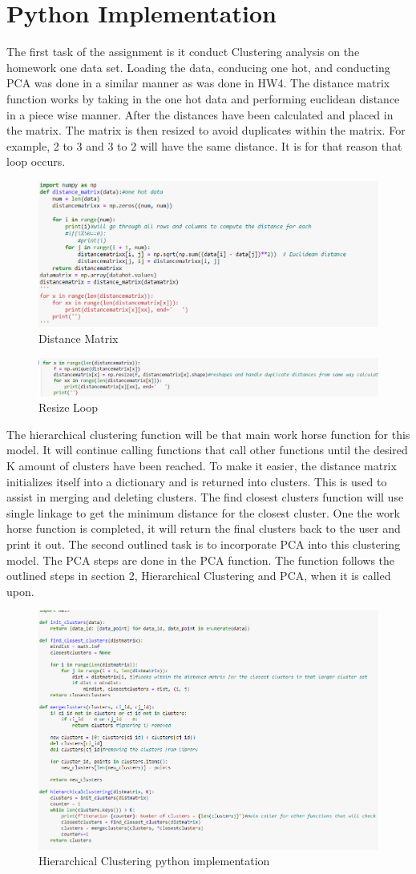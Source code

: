 \documentclass{article}
\begin{document}
\section{Python Implementation}
The first task of the assignment is it conduct  Clustering analysis on the homework one data set. Loading the data, conducing one hot, and conducting PCA was done in a similar manner as was done in HW4. The distance matrix function works by taking in the one hot data and performing euclidean distance in a piece wise manner. After the distances have been calculated and placed in the matrix. The matrix is then resized to avoid duplicates within the matrix. For example, 2 to 3 and 3 to 2 will have the same distance. It is for that reason that loop occurs.
\begin{figure}
    \centering
    \includegraphics[width=0.5\linewidth]{a.png}
    \caption{Distance Matrix}
    \label{fig:enter-label}
\end{figure}
\begin{figure}
    \centering
    \includegraphics[width=0.5\linewidth]{b.png}
    \caption{Resize Loop}
    \label{fig:enter-label}
\end{figure}
The hierarchical clustering function will be that main work horse function for this model. It will continue calling functions that call other functions until the desired K amount of clusters have been reached. To make it easier, the distance matrix initializes itself into a dictionary and is returned into clusters. This is used to assist in merging and deleting clusters. The find closest clusters function will use single linkage to get the minimum distance for the closest cluster. One the work horse function is completed, it will return the final clusters back to the user and print it out.
The second outlined task is to incorporate PCA into this clustering model. The PCA steps are done in the PCA function. The function follows the outlined steps in section 2, Hierarchical Clustering and PCA, when it is called upon.
\begin{figure}
    \centering
    \includegraphics[width=0.5\linewidth]{c.png}
    \caption{Hierarchical Clustering python implementation}
    \label{fig:enter-label}
    
\end{figure}
\end{document}
